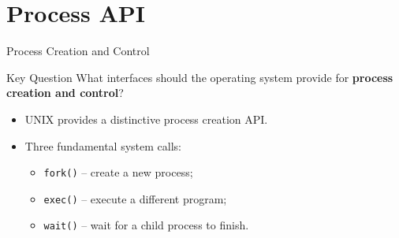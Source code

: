 
\section{Process API}

\begin{frame}{Process Creation and Control}

\begin{block}{Key Question}
What interfaces should the operating system provide for
\textbf{process creation and control}?
\end{block}

\begin{itemize}
    \item UNIX provides a distinctive process creation API.
    \item Three fundamental system calls:
    \begin{itemize}
        \item \texttt{fork()} -- create a new process;
        \item \texttt{exec()} -- execute a different program;
        \item \texttt{wait()} -- wait for a child process to finish.
    \end{itemize}
\end{itemize}

\end{frame}

